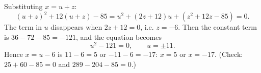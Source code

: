 Substituting $x=u+z$:
\[(u+z)^2+12(u+z)-85=u^2+(2z+12)u+\left(z^2+12z-85\right)=0.\]
The term in $u$ disappears when $2z+12=0$, i.e. $z=-6$. Then the constant term is $36-72-85=-121$, and the equation becomes
\[u^2-121=0,\qquad u=\pm11.\]
Hence $x=u-6$ is $11-6=5$ or $-11-6=-17$: $\boxed{x=5\text{ or }x=-17}$. (Check: $25+60-85=0$ and $289-204-85=0$.)
